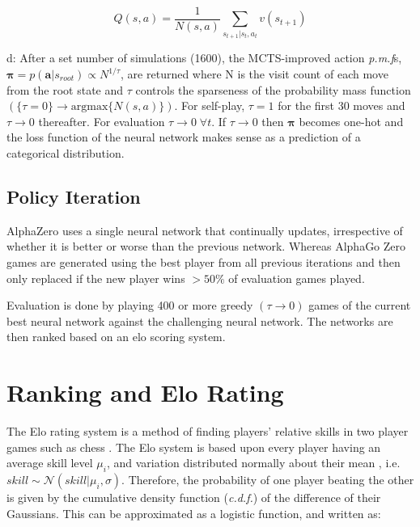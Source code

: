 \documentclass[../main.tex]{subfiles}
\begin{document}
\begin{equation}
   Q(s, a) = \frac{1}{N(s, a)} \sum_{s_{t+1} | s_t, a_t} v(s_{t+1})
   \label{eqn:actionvalue}
\end{equation} 

d:
After a set number of simulations (1600), the MCTS-improved action \textit{p.m.f}s, $\boldsymbol{\pi} = p(\boldsymbol{a} | s_{root}) \propto N^{1/\tau}$, are returned where N is the visit count of each move from the root state and $\tau$ controls the sparseness of the probability mass function $(\{\tau = 0\} \rightarrow \text{argmax}\{N(s, a)\})$. For self-play, $\tau = 1$ for the first 30 moves and $\tau \rightarrow 0$ thereafter. For evaluation $\tau \rightarrow 0 \; \forall t$. If $\tau \rightarrow 0$ then $\boldsymbol{\pi}$ becomes one-hot and the loss function of the neural network makes sense as a prediction of a categorical distribution.

\subsection{Policy Iteration}

AlphaZero uses a single neural network that continually updates, irrespective of whether it is better or worse than the previous network. Whereas AlphaGo Zero games are generated using the best player from all previous iterations and then only replaced if the new player wins $> 50\%$ of evaluation games played.

Evaluation is done by playing 400 or more greedy $(\tau \rightarrow 0)$ games of the current best neural network against the challenging neural network. The networks are then ranked based on an elo scoring system.

\section{Ranking and Elo Rating}

The Elo rating system is a method of finding players' relative skills in two player games such as chess \cite{elo}. The Elo system is based upon every player having an average skill level $\mu_i$, and variation distributed normally about their mean , i.e. $skill \sim \mathcal{N}(skill | \mu_i, \sigma)$. Therefore, the probability of one player beating the other is given by the cumulative density function (\textit{c.d.f.}) of the difference of their Gaussians. This can be approximated as a logistic function, and written as:
\end{document}
